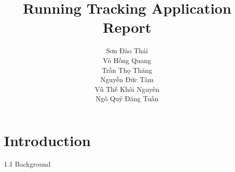 \documentclass{article}
\title{Running Tracking Application Report}
\author{Sơn Đào Thái \\ Võ Hồng Quang \\ Trần Thọ Thăng \\ Nguyễn Đức Tâm \\Vũ Thế Khôi Nguyên \\ Ngô Quý Đăng Tuấn}
\date{}
\begin{document}
\maketitle

\tableofcontents

\section{Introduction}
1.1 Background \\ \\

\end{document}
